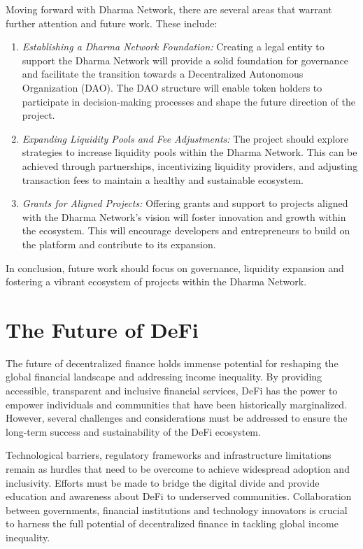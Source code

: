 Moving forward with Dharma Network, there are several areas that warrant further attention and future work. These include:

\begin{enumerate}
    \item \textit{Establishing a Dharma Network Foundation:} Creating a legal entity to support the Dharma Network will provide a solid foundation for governance and facilitate the transition towards a Decentralized Autonomous Organization (DAO). The DAO structure will enable token holders to participate in decision-making processes and shape the future direction of the project.
    \item \textit{Expanding Liquidity Pools and Fee Adjustments:} The project should explore strategies to increase liquidity pools within the Dharma Network. This can be achieved through partnerships, incentivizing liquidity providers, and adjusting transaction fees to maintain a healthy and sustainable ecosystem.
    \item \textit{Grants for Aligned Projects:} Offering grants and support to projects aligned with the Dharma Network's vision will foster innovation and growth within the ecosystem. This will encourage developers and entrepreneurs to build on the platform and contribute to its expansion.
\end{enumerate}

In conclusion, future work should focus on governance, liquidity expansion and fostering a vibrant ecosystem of projects within the Dharma Network.

\section{The Future of DeFi}

The future of decentralized finance holds immense potential for reshaping the global financial landscape and addressing income inequality. By providing accessible, transparent and inclusive financial services, DeFi has the power to empower individuals and communities that have been historically marginalized. However, several challenges and considerations must be addressed to ensure the long-term success and sustainability of the DeFi ecosystem.\newline

Technological barriers, regulatory frameworks and infrastructure limitations remain as hurdles that need to be overcome to achieve widespread adoption and inclusivity. Efforts must be made to bridge the digital divide and provide education and awareness about DeFi to underserved communities. Collaboration between governments, financial institutions and technology innovators is crucial to harness the full potential of decentralized finance in tackling global income inequality.\newline

